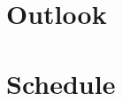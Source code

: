 \documentclass[a4paper,10pt,titlepage]{report}
\begin{document}
\section*{Outlook}





\newpage
\appendix


\section{Schedule}

\end{document}
